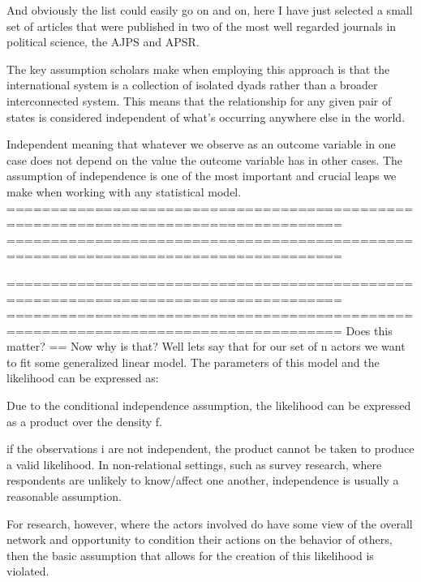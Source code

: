 
And obviously the list could easily go on and on, here I have just selected a small set of articles that were published in two of the most well regarded journals in political science, the AJPS and APSR. 

The key assumption scholars make when employing this approach is that the international system is a collection of isolated dyads rather than a broader interconnected system. This means that the relationship for any given pair of states is considered independent of what's occurring anywhere else in the world. 

Independent meaning that whatever we observe as an outcome variable in one case does not depend on the value the outcome variable has in other cases. The assumption of independence is one of the most important and crucial leaps we make when working with any statistical model. 
====================================================================================
==================================================================================== 

====================================================================================
====================================================================================
Does this matter?
==
Now why is that? Well lets say that for our set of n actors we want to fit some generalized linear model. The parameters of this model and the likelihood can be expressed as:

Due to the conditional independence assumption, the likelihood can be expressed as a product over the density f. 

if the observations i are not independent, the product cannot be taken to produce a valid likelihood. In non-relational settings, such as survey research, where respondents are unlikely to know/affect one another, independence is usually a reasonable assumption.

For research, however, where the actors involved do have some view of the overall network and opportunity to condition their actions on the behavior of others, then the basic assumption that allows for the creation of this likelihood is violated. 


